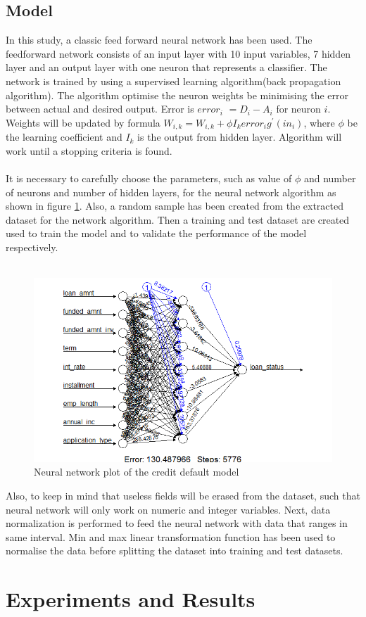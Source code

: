 \documentclass{article}[]
\begin{document}
\subsection{Model}
In this study, a classic feed forward neural network has been used. The feedforward network consists of an input layer with 10 input variables, 7 hidden layer and an output layer with one neuron that represents a classifier. The network is trained by using a supervised learning algorithm(back propagation algorithm). The algorithm optimise the neuron weights be minimising the error between actual and desired output. Error is $error_{i}$ $= D_{i} - A_{i}$ for neuron $i$. Weights will be updated by formula $W_{i,k} = W_{i,k} + \phi I_{k}error_{i}g^{'}(in_{i})$, where $\phi$ be the learning coefficient and $I_{k}$ is the output from hidden layer. Algorithm will work until a stopping criteria is found.\\\\
It is necessary to carefully choose the parameters, such as value of $\phi$ and number of neurons and number of hidden layers, for the neural network algorithm as shown in figure \ref{fig:nn}. Also, a random sample has been created from the extracted dataset for the network algorithm. Then a training and test dataset are created used to train the model and to validate the performance of the model respectively.\\\\ 
\begin{figure}[!htb]
\centering
\includegraphics[width=1\textwidth]{nn.png}
\caption{Neural network plot of the credit default model}
\label{fig:nn}
\end{figure}
Also, to keep in mind that useless fields will be erased from the dataset, such that neural network will only work on numeric and integer variables. Next, data normalization is performed to feed the neural network with data that ranges in same interval. Min and max linear transformation function has been used to normalise the data before splitting the dataset into training and test datasets. 

\section{Experiments and Results}

 
\end{document}
